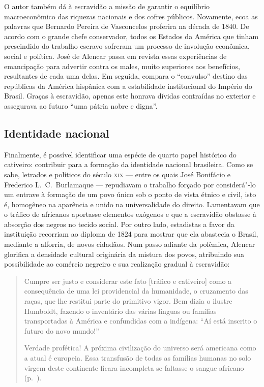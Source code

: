 O autor também dá à  escravidão a missão de garantir o equilíbrio
macroeconômico das riquezas nacionais e dos cofres públicos.
Novamente, ecoa as palavras que Bernardo Pereira de Vasconcelos
proferira na década de 1840. De acordo com o grande chefe conservador,
todos os Estados da América que tinham prescindido do trabalho escravo
sofreram um processo de involução econômica, social e política. José de
Alencar passa em revista essas experiências de emancipação para
advertir contra os males, muito superiores aos benefícios, resultantes
de cada uma delas. Em seguida, compara o ``convulso'' destino das
repúblicas da América hispânica com a estabilidade institucional do
Império do Brasil. Graças à  escravidão, apenas este honrava dívidas
contraídas no exterior e assegurava ao futuro ``uma pátria nobre e digna''. 

\subsection{Identidade nacional}

Finalmente, é possível identificar uma espécie de quarto papel histórico
do cativeiro: contribuir para a formação da identidade nacional
brasileira. Como se sabe, letrados e políticos do século \textsc{xix} --- entre os
quais José Bonifácio e Frederico L.~C.~Burlamaque --- repudiavam o
trabalho forçado por considerá"-lo um entrave à  formação de um povo
único sob o ponto de vista étnico e civil, isto é, homogêneo na
aparência e unido na universalidade do direito. Lamentavam que o
tráfico de africanos aportasse elementos exógenos e que a escravidão
obstasse à  absorção dos negros no tecido social. Por outro lado,
estadistas a favor da instituição recorriam ao diploma de 1824 para
mostrar que ela abastecia o Brasil, mediante a alforria, de novos
cidadãos. Num passo adiante da polêmica, Alencar glorifica a densidade
cultural originária da mistura dos povos, atribuindo sua possibilidade
ao comércio negreiro e sua realização gradual à  escravidão: 

\begin{quote}
Cumpre ser justo e considerar este fato [tráfico e cativeiro] como a
consequência de uma lei providencial da humanidade, o cruzamento das
raças, que lhe restitui parte do primitivo vigor. Bem dizia o ilustre
Humboldt, fazendo o inventário das várias línguas ou famílias
transportadas à  América e confundidas com a indígena: ``Aí está inscrito
o futuro do novo mundo!''

Verdade profética! A próxima civilização do universo será americana como
a atual é europeia. Essa transfusão de todas as famílias humanas no
solo virgem deste continente ficara incompleta se faltasse o sangue
africano (p.~\pageref{profetica}).
\end{quote}


